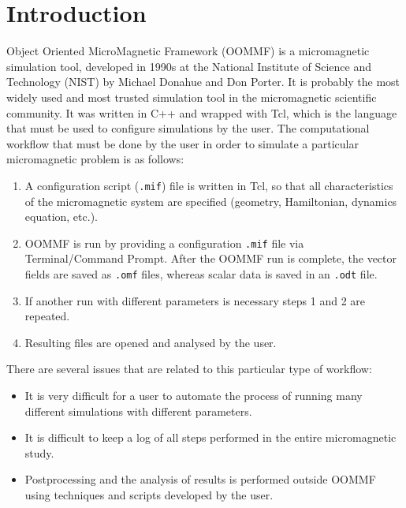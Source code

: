 \documentclass{deliverablereport}
\author{Marijan Beg and Hans Fangohr}
\begin{document}
\maketitle
\githubissuedescription
\newpage
\tableofcontents
\newpage

\section{Introduction}

Object Oriented MicroMagnetic Framework (OOMMF) is a micromagnetic simulation tool, developed in 1990s at the National Institute of Science and Technology (NIST) by Michael Donahue and Don Porter. It is probably the most widely used and most trusted simulation tool in the micromagnetic scientific community. It was written in C++ and wrapped with Tcl, which is the language that must be used to configure simulations by the user. The computational workflow that must be done by the user in order to simulate a particular micromagnetic problem is as follows:

\begin{enumerate}
\item A configuration script (\texttt{.mif}) file is written in Tcl, so that all characteristics of the micromagnetic system are specified (geometry, Hamiltonian, dynamics equation, etc.).
\item OOMMF is run by providing a configuration \texttt{.mif} file via Terminal/Command Prompt. After the OOMMF run is complete, the vector fields are saved as \texttt{.omf} files, whereas scalar data is saved in an \texttt{.odt} file.
  \item If another run with different parameters is necessary steps 1 and 2 are repeated.
  \item Resulting files are opened and analysed by the user.
\end{enumerate}

There are several issues that are related to this particular type of workflow:
\begin{itemize}
\item It is very difficult for a user to automate the process of running many different simulations with different parameters.
\item It is difficult to keep a log of all steps performed in the entire micromagnetic study.
  \item Postprocessing and the analysis of results is performed outside OOMMF using techniques and scripts developed by the user.
\end{itemize}
\end{document}
